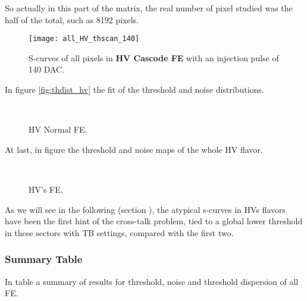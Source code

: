 So actually in this part of the matrix, the real number of pixel studied was the half of the total, such as 8192 pixels.


\begin{figure}[h!]
\centering
\texttt{[image: all\_HV\_thscan\_140]}
\caption{S-curves of all pixels in \textbf{HV Cascode FE} with an injection pulse of 140 DAC.}
\label{fig:hv_scurve_140}
\end{figure}

In figure \vref{fig:thdist_hv} the fit of the threshold and noise distributions.

\begin{figure}[h!]
\centering
{}\quad
{}\\
\caption{HV Normal FE.}
\label{fig:thdist_hv}
\end{figure}


At last, in figure  the threshold and noise maps of the whole HV flavor.

\begin{figure}[h!]
\centering
{}\quad
{}\\
\caption{HV's FE.}
\label{fig:HVs_maps}
\end{figure}

As we will see in the following (section ), the atypical s-curves in HVs flavors have been the first hint of the cross-talk problem, tied to a global lower threshold in these sectors with TB settings, compared with the first two. 


\subsubsection{Summary Table}

In table  a summary of results for threshold, noise and threshold dispersion of all FE.

